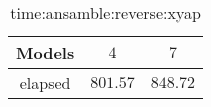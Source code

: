\begin{table}[!ht]
	\centering
	\begin{tabular}{|c|c|c|}
		\hline
		Models & $4$ & $7$ \\ \hline
		elapsed & $801.57$ & $848.72$ \\ \hline
	\end{tabular}
	\caption{time:ansamble:reverse:xyap}
	\label{tab:time:ansamble:reverse:xyap}
\end{table}
